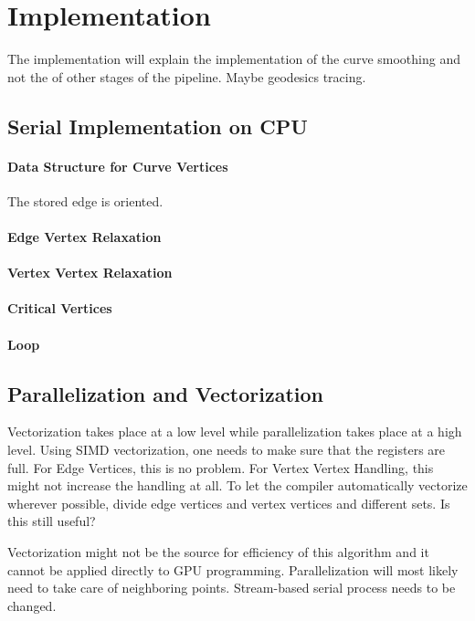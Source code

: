 \documentclass{stdlocal}
\begin{document}
\section{Implementation} %
\label{sec:implementation}

The implementation will explain the implementation of the curve smoothing and not the of other stages of the pipeline.
Maybe geodesics tracing.

\subsection{Serial Implementation on CPU} %
\label{sub:serial_implementation_on_cpu}
  \paragraph{Data Structure for Curve Vertices}
    The stored edge is oriented.
  \paragraph{Edge Vertex Relaxation}
  \paragraph{Vertex Vertex Relaxation}
  \paragraph{Critical Vertices}
  \paragraph{Loop}

\subsection{Parallelization and Vectorization} %
\label{sub:parallelization_and_vectorization}
  Vectorization takes place at a low level while parallelization takes place at a high level.
  Using SIMD vectorization, one needs to make sure that the registers are full.
  For Edge Vertices, this is no problem.
  For Vertex Vertex Handling, this might not increase the handling at all.
  To let the compiler automatically vectorize wherever possible, divide edge vertices and vertex vertices and different sets.
  Is this still useful?

  Vectorization might not be the source for efficiency of this algorithm and it cannot be applied directly to GPU programming.
  Parallelization will most likely need to take care of neighboring points.
  Stream-based serial process needs to be changed.
\end{document}
